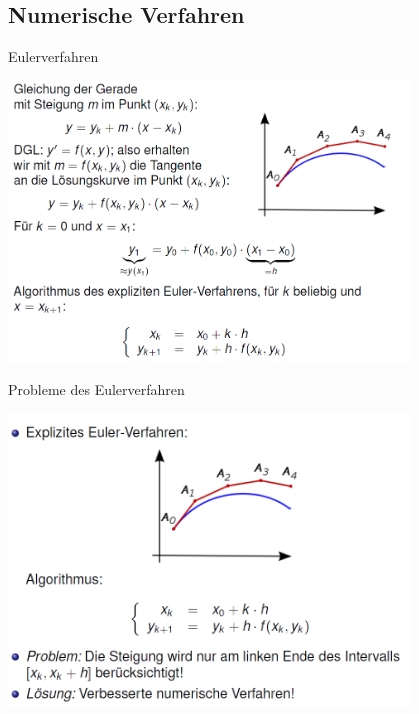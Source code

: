 \subsection{Numerische Verfahren}
\begin{definition}{Eulerverfahren}
  \begin{centering}
  \includegraphics[width=0.8\textwidth]{images/2024-06-02-22-23-19.png}\\
  \end{centering}
\end{definition}
\begin{definition}{Probleme des Eulerverfahren}\\
  \begin{centering}
  \includegraphics[width=0.8\textwidth]{images/2024-06-02-22-24-08.png}\\
  \end{centering}
\end{definition}
